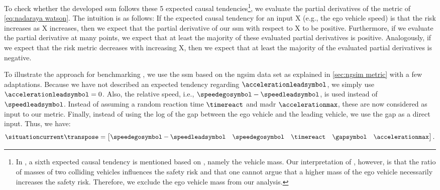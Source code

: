 To check whether the developed \ac{ssm} follows these 5 expected causal tendencies\footnote{In \autocite{mullakkal2017comparative}, a sixth expected causal tendency is mentioned based on \autocite{evans1994driver}, namely the vehicle mass. 
Our interpretation of \autocite{evans1994driver}, however, is that the ratio of masses of two colliding vehicles influences the safety risk and that one cannot argue that a higher mass of the ego vehicle necessarily increases the safety risk. 
Therefore, we exclude the ego vehicle mass from our analysis.}, we evaluate the partial derivatives of the metric of \cref{eq:nadaraya watson}.
The intuition is as follows: If the expected causal tendency for an input X (e.g., the ego vehicle speed) is that the risk increases as X increases, then we expect that the partial derivative of our \ac{ssm} with respect to X to be positive.
Furthermore, if we evaluate the partial derivative at many points, we expect that at least the majority of these evaluated partial derivatives is positive.
Analogously, if we expect that the risk metric decreases with increasing X, then we expect that at least the majority of the evaluated partial derivatives is negative.

To illustrate the approach for benchmarking , we use the \ac{ssm} based on the \ac{ngsim} data set as explained in \cref{sec:ngsim metric} with a few adaptations.
Because we have not described an expected tendency regarding $\accelerationleadsymbol$, we simply use $\accelerationleadsymbol=0$.
Also, the relative speed, i.e., $\speedegosymbol-\speedleadsymbol$, is used instead of $\speedleadsymbol$.
Instead of assuming a random reaction time $\timereact$ and \ac{madr} $\accelerationmax$, these are now considered as input to our metric. 
Finally, instead of using the log of the gap between the ego vehicle and the leading vehicle, we use the gap as a direct input.
Thus, we have:
\begin{equation}
	\label{eq:input partial derivatives}
	\situationcurrent\transpose = \begin{bmatrix}
		\speedegosymbol-\speedleadsymbol & \speedegosymbol & \timereact & \gapsymbol & \accelerationmax
	\end{bmatrix}.
\end{equation}

